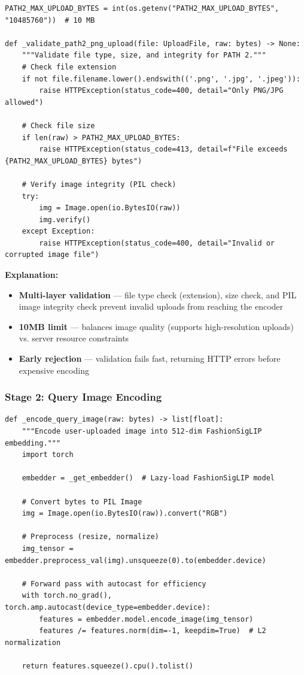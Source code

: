 \begin{lstlisting}[caption={PATH 2 Upload Validation --- api/main.py}]
PATH2_MAX_UPLOAD_BYTES = int(os.getenv("PATH2_MAX_UPLOAD_BYTES", "10485760"))  # 10 MB

def _validate_path2_png_upload(file: UploadFile, raw: bytes) -> None:
    """Validate file type, size, and integrity for PATH 2."""
    # Check file extension
    if not file.filename.lower().endswith(('.png', '.jpg', '.jpeg')):
        raise HTTPException(status_code=400, detail="Only PNG/JPG allowed")
    
    # Check file size
    if len(raw) > PATH2_MAX_UPLOAD_BYTES:
        raise HTTPException(status_code=413, detail=f"File exceeds {PATH2_MAX_UPLOAD_BYTES} bytes")
    
    # Verify image integrity (PIL check)
    try:
        img = Image.open(io.BytesIO(raw))
        img.verify()
    except Exception:
        raise HTTPException(status_code=400, detail="Invalid or corrupted image file")
\end{lstlisting}

\textbf{Explanation:}
\begin{itemize}
    \item \textbf{Multi-layer validation} --- file type check (extension), size check, and PIL image integrity check prevent invalid uploads from reaching the encoder
    \item \textbf{10MB limit} --- balances image quality (supports high-resolution uploads) vs. server resource constraints
    \item \textbf{Early rejection} --- validation fails fast, returning HTTP errors before expensive encoding
\end{itemize}

\subsubsection{Stage 2: Query Image Encoding}

\begin{lstlisting}[caption={Query Image Encoding --- search/image\_query\_engine.py}]
def _encode_query_image(raw: bytes) -> list[float]:
    """Encode user-uploaded image into 512-dim FashionSigLIP embedding."""
    import torch
    
    embedder = _get_embedder()  # Lazy-load FashionSigLIP model
    
    # Convert bytes to PIL Image
    img = Image.open(io.BytesIO(raw)).convert("RGB")
    
    # Preprocess (resize, normalize)
    img_tensor = embedder.preprocess_val(img).unsqueeze(0).to(embedder.device)
    
    # Forward pass with autocast for efficiency
    with torch.no_grad(), torch.amp.autocast(device_type=embedder.device):
        features = embedder.model.encode_image(img_tensor)
        features /= features.norm(dim=-1, keepdim=True)  # L2 normalization
    
    return features.squeeze().cpu().tolist()
\end{lstlisting}

